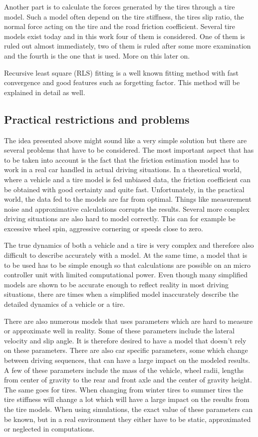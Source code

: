 Another part is to calculate the forces generated by the tires through a tire model. Such a model often depend on the tire stiffness, the tires slip ratio, the normal force acting on the tire and the road friction coefficient. Several tire models exist today and in this work four of them is considered. One of them is ruled out almost immediately, two of them is ruled after some more examination and the fourth is the one that is used. More on this later on.

Recursive least square (RLS) fitting is a well known fitting method with fast convergence and good features such as forgetting factor. This method will be explained in detail as well.

\subsection{Practical restrictions and problems}
The idea presented above might sound like a very simple solution but there are several problems that have to be considered. The most important aspect that has to be taken into account is the fact that the friction estimation model has to work in a real car handled in actual driving situations. In a theoretical world, where a vehicle and a tire model is fed unbiased data, the friction coefficient can be obtained with good certainty and quite fast. Unfortunately, in the practical world, the data fed to the models are far from optimal. Things like measurement noise and approximative calculations corrupts the results. Several more complex driving situations are also hard to model correctly. This can for example be excessive wheel spin, aggressive cornering or speeds close to zero.

The true dynamics of both a vehicle and a tire is very complex and therefore also difficult to describe accurately with a model. At the same time, a model that is to be used has to be simple enough so that calculations are possible on an micro controller unit with limited computational power. Even though many simplified models are shown to be accurate enough to reflect reality in most driving situations, there are times when a simplified model inaccurately describe the detailed dynamics of a vehicle or a tire. 

There are also numerous models that uses parameters which are hard to measure or approximate well in reality. Some of these parameters include the lateral velocity and slip angle. It is therefore desired to have a model that doesn't rely on these parameters. There are also car specific parameters, some which change between driving sequences, that can have a large impact on the modeled results. A few of these parameters include the mass of the vehicle, wheel radii, lengths from center of gravity to the rear and front axle and the center of gravity height. The same goes for tires. When changing from winter tires to summer tires the tire stiffness will change a lot which will have a large impact on the results from the tire models. When using simulations, the exact value of these parameters can be known, but in a real environment they either have to be static, approximated or neglected in computations.

